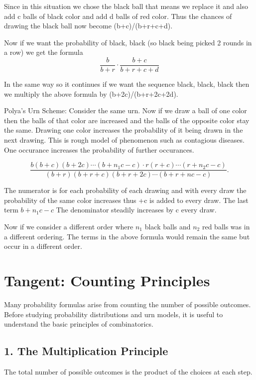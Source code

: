 \documentclass[12pt]{article}
\begin{document}
Since in this situation we chose the black ball that means we replace it and also add c balls of black color and add d balls of red color. Thus the chances of drawing the black ball now become (b+c)/(b+r+c+d). 

Now if we want the probability of black, black (so black being picked 2 rounds in a row) we get the formula 
\[\frac{b}{b+r} \cdot \frac{b+c}{b+r+c+d}\]

In the same way so it continues if we want the sequence black, black, black then we multiply the above formula by (b+2c)/(b+r+2c+2d). 

Polya's Urn Scheme: Consider the same urn. Now if we draw a ball of one color then the balls of that color are increased and the balls of the opposite color stay the same. Drawing one color increases the probability of it being drawn in the next drawing. 
This is rough model of phenomenon such as contagious diseases. One occurance increases the probability of further occurances. 

\[
\frac{
b(b+c)(b+2c)\cdots(b+n_1c-c)\cdot
r(r+c)\cdots(r+n_2c-c)
}{
(b+r)(b+r+c)(b+r+2c)\cdots(b+r+nc-c)
}.
\]

The numerator is for each probability of each drawing and with every draw the probability of the same color increases thus +c is added to every draw. The last term $b+n_1c-c$
The denominator steadily increases by c every draw.  

Now if we consider a different order where $n_1$ black balls and $n_2$ red balls was in a different ordering. The terms in the above formula would remain the same but occur in a different order. 

\section*{Tangent: Counting Principles}

Many probability formulas arise from counting the number of possible
outcomes. Before studying probability distributions and urn models,
it is useful to understand the basic principles of combinatorics.

\subsection*{1. The Multiplication Principle}

The total number of possible outcomes is the product of the choices at
each step.
\end{document}
